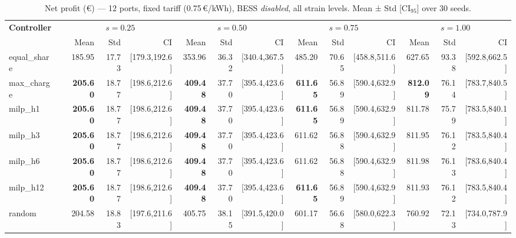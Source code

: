 \begin{table}[!htb]
\centering
\caption{Net profit (€) — 12 ports, fixed tariff (0.75\,€/kWh), BESS \emph{disabled},
         all strain levels. Mean ± Std [CI$_{95}$] over 30 seeds.}
\label{tab:gc_12port_fixed_nobess}
\setlength{\tabcolsep}{3pt}
\begin{tabular}{lp{1cm} rrr rrr rrr rrr}
\toprule
\textbf{Controller} & &
  \multicolumn{3}{c}{$s=0.25$} &
  \multicolumn{3}{c}{$s=0.50$} &
  \multicolumn{3}{c}{$s=0.75$} &
  \multicolumn{3}{c}{$s=1.00$} \\
\cmidrule(lr){3-5}\cmidrule(lr){6-8}\cmidrule(lr){9-11}\cmidrule(lr){12-14}
 & & Mean & Std & CI & Mean & Std & CI & Mean & Std & CI & Mean & Std & CI \\
\midrule
equal\_share & & 185.95 & 17.73 & [179.3,192.6] & 353.96 & 36.32 & [340.4,367.5] & 485.20 & 70.65 & [458.8,511.6] & 627.65 & 93.38 & [592.8,662.5] \\
max\_charge  & & \textbf{205.60} & 18.77 & [198.6,212.6] & \textbf{409.48} & 37.70 & [395.4,423.6] & \textbf{611.65} & 56.89 & [590.4,632.9] & \textbf{812.09} & 76.14 & [783.7,840.5] \\
milp\_h1     & & \textbf{205.60} & 18.77 & [198.6,212.6] & \textbf{409.48} & 37.70 & [395.4,423.6] & \textbf{611.65} & 56.89 & [590.4,632.9] & 811.78 & 75.79 & [783.5,840.1] \\
milp\_h3     & & \textbf{205.60} & 18.77 & [198.6,212.6] & \textbf{409.48} & 37.70 & [395.4,423.6] & 611.62 & 56.88 & [590.4,632.9] & 811.95 & 76.12 & [783.5,840.4] \\
milp\_h6     & & \textbf{205.60} & 18.77 & [198.6,212.6] & \textbf{409.48} & 37.70 & [395.4,423.6] & 611.62 & 56.88 & [590.4,632.9] & 811.98 & 76.13 & [783.6,840.4] \\
milp\_h12    & & \textbf{205.60} & 18.77 & [198.6,212.6] & \textbf{409.48} & 37.70 & [395.4,423.6] & \textbf{611.65} & 56.89 & [590.4,632.9] & 811.93 & 76.12 & [783.5,840.4] \\
random       & & 204.58 & 18.83 & [197.6,211.6] & 405.75 & 38.15 & [391.5,420.0] & 601.17 & 56.68 & [580.0,622.3] & 760.92 & 72.13 & [734.0,787.9] \\
\bottomrule
\end{tabular}
\end{table}

